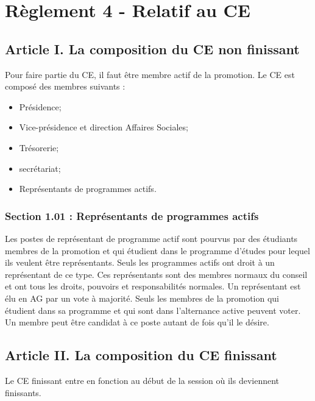 \section*{Règlement 4 - Relatif au CE} 

\subsection*{Article I. La composition du CE non finissant}
Pour faire partie du CE, il faut être membre actif de la promotion. Le CE est composé des membres suivants : 
\begin{itemize}
\item Présidence; 
\item Vice-présidence et direction Affaires Sociales;
\item Trésorerie; 
\item secrétariat; 
\item Représentants de programmes actifs.
\end{itemize}

\subsubsection*{Section 1.01 : Représentants de programmes actifs}
Les postes de représentant de programme actif sont pourvus par des étudiants membres de la promotion et qui étudient dans le programme d’études pour lequel ils veulent être représentants. Seuls les programmes actifs ont droit à un représentant de ce type. Ces représentants sont des membres normaux du conseil et ont tous les droits, pouvoirs et responsabilités normales. Un représentant est élu en AG par un vote à majorité. Seuls les membres de la promotion qui étudient dans sa programme  et qui sont dans l’alternance active peuvent voter. Un membre peut être candidat à ce poste autant de fois qu’il le désire. 

\subsection*{Article II. La composition du CE finissant}
Le CE finissant entre en fonction au début de la session où ils deviennent finissants.\\

